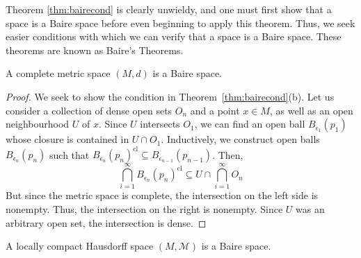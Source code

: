 \documentclass[prb,12pt]{revtex4-2}
\theoremstyle{definition}
\theoremstyle{definition}
\theoremstyle{definition}
\begin{document}
Theorem \ref{thm:bairecond} is clearly unwieldy, and one must first show that a space is a Baire space before even beginning to apply this theorem. Thus, we seek easier conditions with which we can verify that a space is a Baire space. These theorems are known as Baire's Theorems.
	\begin{Theorem}[Baire I]
		A complete metric space $(M,d)$ is a Baire space.
	\end{Theorem}
\begin{proof}
	We seek to show the condition in Theorem~\ref{thm:bairecond}(b). Let us consider a collection of dense open sets $O_n$ and a point $x\in M$, as well as an open neighbourhood $U$ of $x$. Since $U$ intersects $O_1$, we can find an open ball $B_{\epsilon_1}(p_1)$ whose closure is contained in $U \cap O_1$. Inductively, we construct open balls $B_{\epsilon_n}(p_n)$ such that $B_{\epsilon_n}(p_n)^\text{cl}\subseteq B_{\epsilon_{n-1}}(p_{n-1})$. Then, 
	\[\bigcap_{i=1}^\infty B_{\epsilon_n}(p_n)^\text{cl}\subseteq U \cap \bigcap_{i=1}^\infty O_n\]
	But since the metric space is complete, the intersection on the left side is nonempty. Thus, the intersection on the right is nonempty. Since $U$ was an arbitrary open set, the intersection is dense. 
\end{proof}
	\begin{Theorem}[Baire II]
		A locally compact Hausdorff space $(M, \mathcal{M})$ is a Baire space.
	\end{Theorem}
\end{document}
